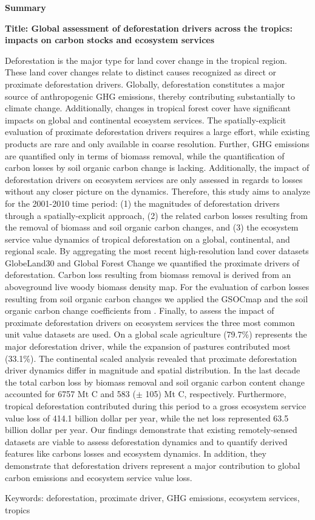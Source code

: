 \thispagestyle{empty}

\begin{center}
	\textbf{Summary}
\end{center}
	\textbf{Title: Global assessment of deforestation drivers across the tropics: impacts on carbon stocks and ecosystem services}

	Deforestation is the major type for land cover change in the tropical region. These land cover changes relate to distinct causes recognized as direct or proximate deforestation drivers. Globally, deforestation constitutes a major source of anthropogenic \ac{GHG} emissions, thereby contributing substantially to climate change. Additionally, changes in tropical forest cover have significant impacts on global and continental ecosystem services. The spatially-explicit evaluation of proximate deforestation drivers requires a large effort, while existing products are rare and only available in coarse resolution. Further, \ac{GHG} emissions are quantified only in terms of biomass removal, while the quantification of carbon losses by soil organic carbon change is lacking. Additionally, the impact of deforestation drivers on ecosystem services are only assessed in regards to losses without any closer picture on the dynamics. Therefore, this study aims to analyze for the 2001-2010 time period: (1) the magnitudes of deforestation drivers through a spatially-explicit approach, (2) the related carbon losses resulting from the removal of biomass and soil organic carbon changes, and (3) the ecosystem service value dynamics of tropical deforestation on a global, continental, and regional scale. By aggregating the most recent high-resolution land cover datasets GlobeLand30 and Global Forest Change we quantified the proximate drivers of deforestation. Carbon loss resulting from biomass removal is derived from an aboveground live woody biomass density map.  For the evaluation of carbon losses resulting from soil organic carbon changes we applied the GSOCmap and the soil organic carbon change coefficients from \citet{Don2010}. Finally, to assess the impact of proximate deforestation drivers on ecosystem services the three most common unit value datasets are used. On a global scale agriculture (79.7\%) represents the major deforestation driver, while the expansion of pastures contributed most (33.1\%). The continental scaled analysis revealed that proximate deforestation driver dynamics differ in magnitude and spatial distribution. In the last decade the total carbon loss by biomass removal and soil organic carbon content change accounted for 6757 Mt C and 583 ($\pm$ 105) Mt C, respectively. Furthermore, tropical deforestation contributed during this period to a gross ecosystem service value loss of 414.1 billion dollar per year, while the net loss represented 63.5 billion dollar per year.  Our findings demonstrate that existing remotely-sensed datasets are viable to assess deforestation dynamics and to quantify derived features like carbons losses and ecosystem dynamics. In addition, they demonstrate that deforestation drivers represent a major contribution to global carbon emissions and ecosystem service value loss.

	Keywords: deforestation, proximate driver, GHG emissions, ecosystem services, tropics